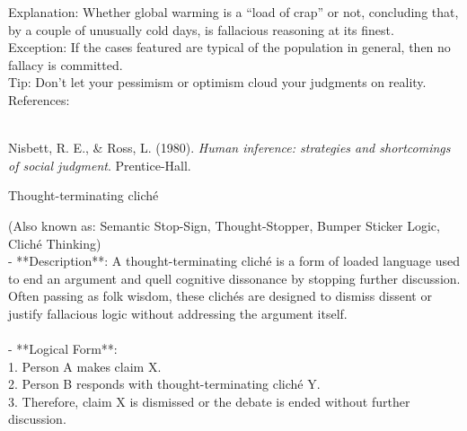 \documentclass[a4paper,12pt,single,pdftex]{scrbook}
\begin{document}
    
      Explanation: Whether global warming is a “load of crap” or not, concluding that, by a couple of unusually cold days, is fallacious reasoning at its finest.
    \\

    
      Exception: If the cases featured are typical of the population in general, then no fallacy is committed.
    \\

    
      Tip: Don’t let your pessimism or optimism cloud your judgments on reality.
    \\

    References:

    
      
        
      \\

      
        
          Nisbett, R. E., \& Ross, L. (1980). {\it Human inference: strategies and shortcomings of social judgment}. Prentice-Hall.
        
      
    
  

Thought-terminating cliché
    
      (Also known as: Semantic Stop-Sign, Thought-Stopper, Bumper Sticker Logic, Cliché Thinking)
    \\

  
    
      - **Description**: A thought-terminating cliché is a form of loaded language used to end an argument and quell cognitive dissonance by stopping further discussion. Often passing as folk wisdom, these clichés are designed to dismiss dissent or justify fallacious logic without addressing the argument itself.
    \\

    
      
    \\

    
      - **Logical Form**:
    \\

    
        1. Person A makes claim X.
    \\

    
        2. Person B responds with thought-terminating cliché Y.
    \\

    
        3. Therefore, claim X is dismissed or the debate is ended without further discussion.
    \\
\end{document}
